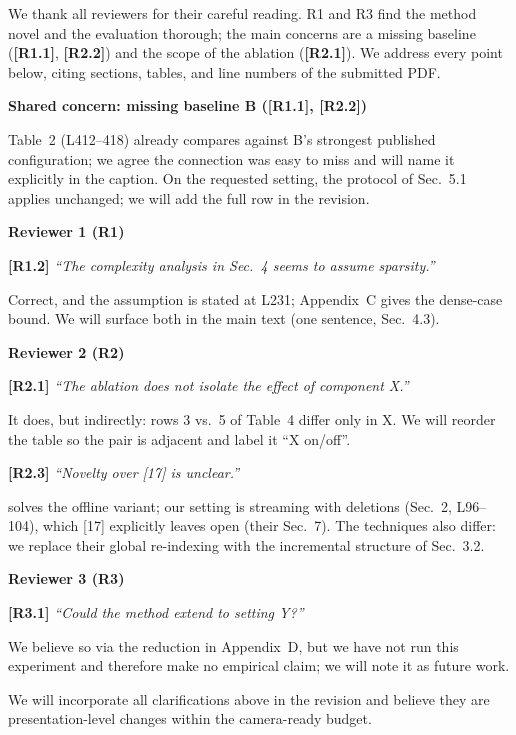 \documentclass[10pt,twocolumn,letterpaper]{article}
\newcommand{\rpoint}[2]{%
  \vspace{2.5pt}\noindent\textbf{[#1]} \textit{``#2''}\par\nopagebreak}
\newcommand{\resp}[1]{\noindent #1\par}
\newcommand{\rhead}[1]{%
  \vspace{5pt}\noindent\textbf{\large #1}\par\nopagebreak\vspace{1.5pt}}
\newcommand{\rid}[1]{\textbf{[#1]}}
\begin{document}
\thispagestyle{empty}

We thank all reviewers for their careful reading. R1 and R3 find the method
novel and the evaluation thorough; the main concerns are a missing baseline
(\rid{R1.1}, \rid{R2.2}) and the scope of the ablation (\rid{R2.1}). We
address every point below, citing sections, tables, and line numbers of the
submitted PDF.

\rhead{Shared concern: missing baseline B (\rid{R1.1}, \rid{R2.2})}
\resp{Table~2 (L412--418) already compares against B's strongest published
configuration; we agree the connection was easy to miss and will name it
explicitly in the caption. On the requested setting, the protocol of
Sec.~5.1 applies unchanged; we will add the full row in the revision.}

\rhead{Reviewer 1 (R1)}

\rpoint{R1.2}{The complexity analysis in Sec.~4 seems to assume sparsity.}
\resp{Correct, and the assumption is stated at L231; Appendix~C gives the
dense-case bound. We will surface both in the main text (one sentence,
Sec.~4.3).}

\rhead{Reviewer 2 (R2)}

\rpoint{R2.1}{The ablation does not isolate the effect of component X.}
\resp{It does, but indirectly: rows 3 vs.\ 5 of Table~4 differ only in X.
We will reorder the table so the pair is adjacent and label it
``X on/off''.}

\rpoint{R2.3}{Novelty over [17] is unclear.}
\resp{[17] solves the offline variant; our setting is streaming with
deletions (Sec.~2, L96--104), which [17] explicitly leaves open
(their Sec.~7). The techniques also differ: we replace their global
re-indexing with the incremental structure of Sec.~3.2.}

\rhead{Reviewer 3 (R3)}

\rpoint{R3.1}{Could the method extend to setting Y?}
\resp{We believe so via the reduction in Appendix~D, but we have not run
this experiment and therefore make no empirical claim; we will note it as
future work.}

\vspace{4pt}
\noindent We will incorporate all clarifications above in the revision and
believe they are presentation-level changes within the camera-ready budget.
\end{document}
